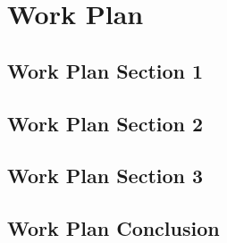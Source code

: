 %
\chapter{Work Plan}
\label{sec:workplan}


\Blindtext[2][1]

\section{Work Plan Section 1}
\label{sec:workplan:sec1}

\Blindtext[2][2]

\section{Work Plan Section 2}
\label{sec:workplan:sec2}

\Blindtext[3][2]

\section{Work Plan Section 3}
\label{sec:workplan:sec3}

\Blindtext[4][2]

\section{Work Plan Conclusion}
\label{sec:workplan:conclusion}

\Blindtext[2][1]
